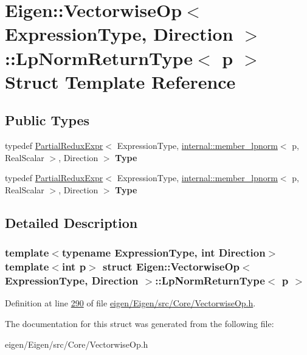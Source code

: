 \hypertarget{struct_eigen_1_1_vectorwise_op_1_1_lp_norm_return_type}{}\section{Eigen\+:\+:Vectorwise\+Op$<$ Expression\+Type, Direction $>$\+:\+:Lp\+Norm\+Return\+Type$<$ p $>$ Struct Template Reference}
\label{struct_eigen_1_1_vectorwise_op_1_1_lp_norm_return_type}
\subsection*{Public Types}
\begin{DoxyCompactItemize}
\item 
\mbox{\label{struct_eigen_1_1_vectorwise_op_1_1_lp_norm_return_type_aff25bd2bad22a9518a282ea07f54b6df}} 
typedef \hyperlink{group___core___module_class_eigen_1_1_partial_redux_expr}{Partial\+Redux\+Expr}$<$ Expression\+Type, \hyperlink{struct_eigen_1_1internal_1_1member__lpnorm}{internal\+::member\+\_\+lpnorm}$<$ p, Real\+Scalar $>$, Direction $>$ {\bfseries Type}
\item 
\mbox{\label{struct_eigen_1_1_vectorwise_op_1_1_lp_norm_return_type_aff25bd2bad22a9518a282ea07f54b6df}} 
typedef \hyperlink{group___core___module_class_eigen_1_1_partial_redux_expr}{Partial\+Redux\+Expr}$<$ Expression\+Type, \hyperlink{struct_eigen_1_1internal_1_1member__lpnorm}{internal\+::member\+\_\+lpnorm}$<$ p, Real\+Scalar $>$, Direction $>$ {\bfseries Type}
\end{DoxyCompactItemize}


\subsection{Detailed Description}
\subsubsection*{template$<$typename Expression\+Type, int Direction$>$\newline
template$<$int p$>$\newline
struct Eigen\+::\+Vectorwise\+Op$<$ Expression\+Type, Direction $>$\+::\+Lp\+Norm\+Return\+Type$<$ p $>$}



Definition at line \hyperlink{eigen_2_eigen_2src_2_core_2_vectorwise_op_8h_source_l00290}{290} of file \hyperlink{eigen_2_eigen_2src_2_core_2_vectorwise_op_8h_source}{eigen/\+Eigen/src/\+Core/\+Vectorwise\+Op.\+h}.



The documentation for this struct was generated from the following file\+:\begin{DoxyCompactItemize}
\item 
eigen/\+Eigen/src/\+Core/\+Vectorwise\+Op.\+h\end{DoxyCompactItemize}
